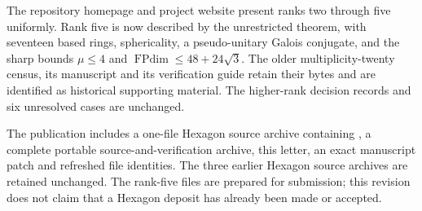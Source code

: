 \documentclass[11pt,a4paper]{article}
\begin{document}
The repository homepage and project website present ranks two through
five uniformly. Rank five is now described by the unrestricted theorem,
with seventeen based rings, sphericality, a pseudo-unitary Galois
conjugate, and the sharp bounds $\mu\le4$ and
$\operatorname{FPdim}\le48+24\sqrt3$. The older multiplicity-twenty
census, its manuscript and its verification guide retain their bytes
and are identified as historical supporting material. The higher-rank
decision records and six unresolved cases are unchanged.

The publication includes a one-file Hexagon source archive containing
, a complete portable source-and-verification archive,
this letter, an exact manuscript patch and refreshed file identities.
The three earlier Hexagon source archives are retained unchanged.
The rank-five files are prepared for submission; this revision does not
claim that a Hexagon deposit has already been made or accepted.
\end{document}
